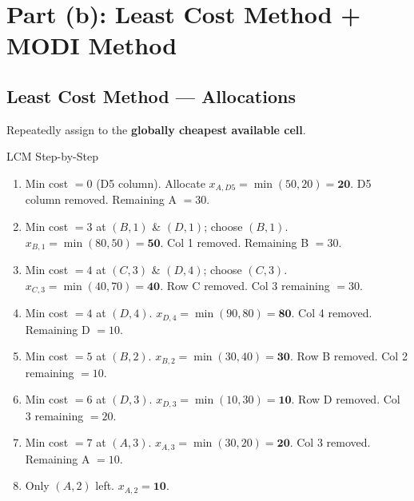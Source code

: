 \documentclass[12pt]{article}
\begin{document}
\section{Part (b): Least Cost Method + MODI Method}

\subsection*{Least Cost Method --- Allocations}

Repeatedly assign to the \textbf{globally cheapest available cell}.

\begin{iterbox}{LCM Step-by-Step}
\begin{enumerate}[leftmargin=*, label=\textbf{Step \arabic*.}, itemsep=4pt]
  \item Min cost $= 0$ (D5 column). Allocate $x_{A,D5} = \min(50,20) = \mathbf{20}$.
        D5 column removed. Remaining A $= 30$.
  \item Min cost $= 3$ at $(B,1)$ \& $(D,1)$; choose $(B,1)$.
        $x_{B,1} = \min(80,50) = \mathbf{50}$. Col 1 removed. Remaining B $= 30$.
  \item Min cost $= 4$ at $(C,3)$ \& $(D,4)$; choose $(C,3)$.
        $x_{C,3} = \min(40,70) = \mathbf{40}$. Row C removed. Col 3 remaining $= 30$.
  \item Min cost $= 4$ at $(D,4)$.
        $x_{D,4} = \min(90,80) = \mathbf{80}$. Col 4 removed. Remaining D $= 10$.
  \item Min cost $= 5$ at $(B,2)$.
        $x_{B,2} = \min(30,40) = \mathbf{30}$. Row B removed. Col 2 remaining $= 10$.
  \item Min cost $= 6$ at $(D,3)$.
        $x_{D,3} = \min(10,30) = \mathbf{10}$. Row D removed. Col 3 remaining $= 20$.
  \item Min cost $= 7$ at $(A,3)$.
        $x_{A,3} = \min(30,20) = \mathbf{20}$. Col 3 removed. Remaining A $= 10$.
  \item Only $(A,2)$ left. $x_{A,2} = \mathbf{10}$.
\end{enumerate}
\end{iterbox}

\vspace{8pt}
\end{document}
